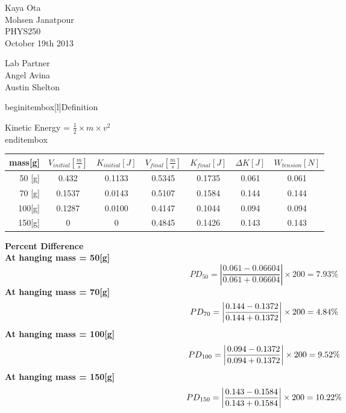 \documentclass{article}
\begin{document}
\large
\begin{flushright}
Kaya Ota\\
Mohsen Janatpour\\ 
PHYS250\\
October 19th 2013\\
\end{flushright}
\begin{flushleft}
Lab Partner\\
Angel Avina\\
Austin Shelton\\
\end{flushleft}

\begin{center}
\scalebox{1.5}{
\bf Calculation
}
\end{center}
begin{itembox}[l]{Definition}

	Kinetic Energy = $\frac{1}{2}\times m\times v^2$\\

end{itembox}

\begin{table}[htb]
\scalebox{2.0}
{
  \begin{tabular}{|r||c|c|c|c|c|c|}\hline
    mass[g] & $V_{initial}[\frac{m}{s}]$ &$K_{initial}[J]$ & $V_{final}[\frac{m}{s}]$& $K_{final}[J]$&$\Delta K[J]$&$W_{tension}[N]$ \\\hline
    50 [g]   &0.432  & 0.1133 & 0.5345 & 0.1735 & 0.061 & 0.061\\\hline
    70 [g]   &0.1537 & 0.0143 & 0.5107 & 0.1584 & 0.144 & 0.144\\\hline
    100[g]  &0.1287 & 0.0100 & 0.4147 & 0.1044 & 0.094 & 0.094\\\hline
    150[g]  &0      & 0      & 0.4845 & 0.1426 & 0.143 &0.143\\\hline
  \end{tabular}
}
\end{table}


\bf Percent Difference\\

At hanging mass = 50[g]\\
$$
PD_{50} = \left|\frac{0.061-0.06604}{0.061+0.06604}\right|\times200=7.93\%
$$
At hanging mass = 70[g]\\
\[
PD_{70} = \left|\frac{0.144-0.1372}{0.144+0.1372}\right|\times200=4.84\%\\
\]
At hanging mass = 100[g]\\
\[
PD_{100} = \left|\frac{0.094-0.1372}{0.094+0.1372}\right|\times200=9.52\%\\
\]
At hanging mass = 150[g]\\
$$
PD_{150} = \left|\frac{0.143-0.1584}{0.143+0.1584}\right|\times200=10.22\%\\
$$
\end{document}
